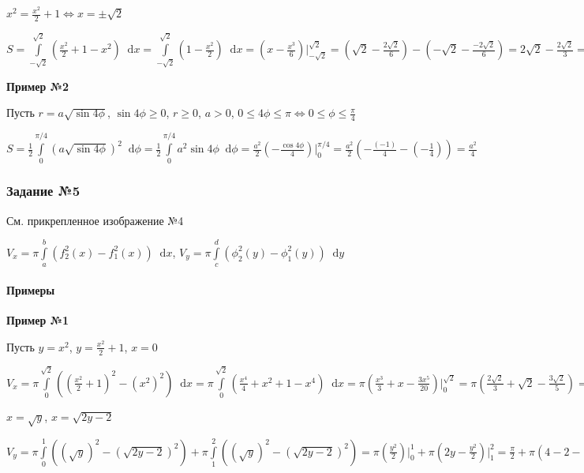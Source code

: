 \documentclass{article}
\newcommand*\diff{\mathop{}\!\mathrm{d}}
\begin{document}
$x^2 = \frac{x^2}{2} + 1 \Longleftrightarrow x = \pm \sqrt{2}$

$S = \int\limits_{-\sqrt{2}}^{\sqrt{2}} (\frac{x^2}{2} + 1 - x^2) \diff x = \int\limits_{-\sqrt{2}}^{\sqrt{2}} (1 - \frac{x^2}{2}) \diff x = (x - \frac{x^3}{6}) \bigg|_{-\sqrt{2}}^{\sqrt{2}} = (\sqrt{2} - \frac{2\sqrt{2}}{6}) - (-\sqrt{2} - \frac{-2\sqrt{2}}{6}) = 2\sqrt{2} - \frac{2\sqrt{2}}{3} = \frac{4\sqrt{2}}{3}$

\hfill

\textbf{Пример №2}

Пусть $r = a \sqrt{\sin 4\phi}$, $\sin 4\phi \ge 0$, $r \ge 0$, $a > 0$, $0 \le 4\phi \le \pi \Longleftrightarrow 0 \le \phi \le \frac{\pi}{4}$

$S = \frac{1}{2} \int\limits_{0}^{\pi/4} (a \sqrt{\sin 4\phi})^2 \diff \phi = \frac{1}{2} \int\limits_{0}^{\pi/4} a^2 \sin 4 \phi \diff \phi = \frac{a^2}{2} (- \frac{\cos 4\phi}{4}) \bigg|_{0}^{\pi/4} = \frac{a^2}{2} (- \frac{(-1)}{4} - (- \frac{1}{4})) = \frac{a^2}{4}$ 

\subsubsection{Задание №5}

См. прикрепленное изображение №4

$V_{x} = \pi \int\limits_{a}^{b} (f_2^2(x) - f_1^2(x)) \diff x$, $V_y = \pi \int\limits_{c}^{d} (\phi_2^2(y) - \phi_1^2(y)) \diff y$

\paragraph{Примеры}

\textbf{Пример №1}

Пусть $y = x^2$, $y = \frac{x^2}{2} + 1$, $x = 0$

$V_x = \pi \int\limits_{0}^{\sqrt{2}} ((\frac{x^2}{2} + 1)^2 - (x^2)^2) \diff x = \pi \int\limits_{0}^{\sqrt{2}} (\frac{x^4}{4} + x^2 + 1 - x^4) \diff x = \pi (\frac{x^3}{3} + x - \frac{3x^5}{20}) \bigg|_{0}^{\sqrt{2}} = \pi (\frac{2\sqrt{2}}{3} + \sqrt{2} - \frac{3\sqrt{2}}{5}) = \pi (\frac{10\sqrt{2} + 15\sqrt{2} - 9\sqrt{2}}{15}) = \frac{16\sqrt{2}}{15} \pi$

$x = \sqrt{y}$, $x = \sqrt{2y - 2}$

$V_y = \pi \int\limits_{0}^{1} ((\sqrt{y})^2 - (\sqrt{2y - 2})^2) + \pi \int\limits_{1}^{2} ((\sqrt{y})^2 - (\sqrt{2y - 2})^2) = \pi (\frac{y^2}{2}) \bigg|_{0}^{1} + \pi (2y - \frac{y^2}{2}) \bigg|_{1}^{2} = \frac{\pi}{2} + \pi (4 - 2 - (2 - \frac{1}{2})) = \pi$
\end{document}
